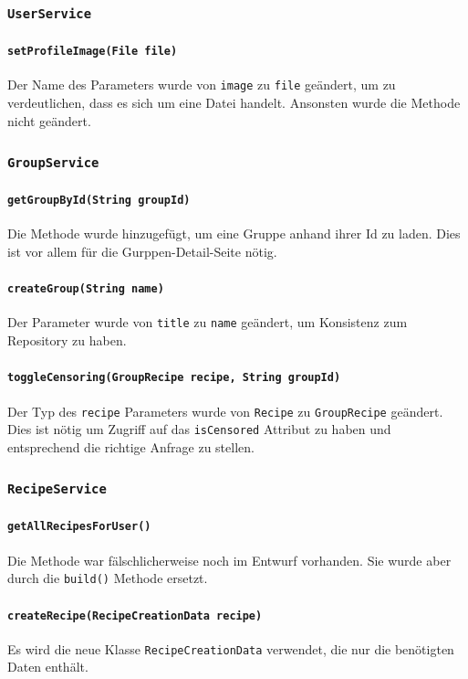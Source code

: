 \documentclass{implementierungsheft}
\begin{document}
\subsubsection{\texttt{UserService}}
\paragraph*{\texttt{setProfileImage(File file)}}
Der Name des Parameters wurde von \texttt{image} zu \texttt{file} geändert, um zu verdeutlichen, dass es sich um eine Datei handelt. Ansonsten wurde die Methode nicht geändert.
\subsubsection{\texttt{GroupService}}
\paragraph*{\texttt{getGroupById(String groupId)}}
Die Methode wurde hinzugefügt, um eine Gruppe anhand ihrer Id zu laden. Dies ist vor allem für die Gurppen-Detail-Seite nötig.
\paragraph{\texttt{createGroup(String name)}}
Der Parameter wurde von \texttt{title} zu \texttt{name} geändert, um Konsistenz zum Repository zu haben.
\paragraph{\texttt{toggleCensoring(GroupRecipe recipe, String groupId)}}
Der Typ des \texttt{recipe} Parameters wurde von \texttt{Recipe} zu \texttt{GroupRecipe} geändert. Dies ist nötig um Zugriff auf das \texttt{isCensored} Attribut zu haben und entsprechend die richtige Anfrage zu stellen.
\subsubsection{\texttt{RecipeService}}
\paragraph{\texttt{getAllRecipesForUser()}}
Die Methode war fälschlicherweise noch im Entwurf vorhanden. Sie wurde aber durch die \texttt{build()} Methode ersetzt.
\paragraph{\texttt{createRecipe(RecipeCreationData recipe)}}
Es wird die neue Klasse \texttt{RecipeCreationData} verwendet, die nur die benötigten Daten enthält.
\end{document}

